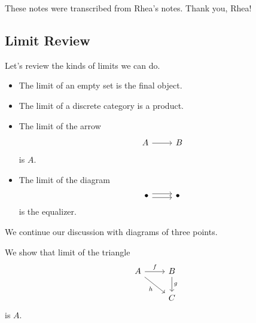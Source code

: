 
These notes were transcribed from Rhea's notes. Thank you, Rhea!

\subsection{Limit Review}
Let's review the kinds of limits we can do.
\begin{itemize}
	\item The limit of an empty set is the final object.
	\item The limit of a discrete category is a product.
	\item The limit of the arrow
	\[\begin{tikzcd}
		A & B
		\arrow[from=1-1, to=1-2]
	\end{tikzcd}\]
	is $A$.
	\item The limit of the diagram
	\[\begin{tikzcd}
		\bullet & \bullet
		\arrow[shift right=1, from=1-1, to=1-2]
		\arrow[shift left=1, from=1-1, to=1-2]
	\end{tikzcd}\]
	is the equalizer.
\end{itemize}
We continue our discussion with diagrams of three points.
\begin{exe}
	We show that limit of the triangle
	\[\begin{tikzcd}
		A & B \\
		& C
		\arrow["f", from=1-1, to=1-2]
		\arrow["g", from=1-2, to=2-2]
		\arrow["h"', from=1-1, to=2-2]
	\end{tikzcd}\]
	is $A$.
\end{exe}
